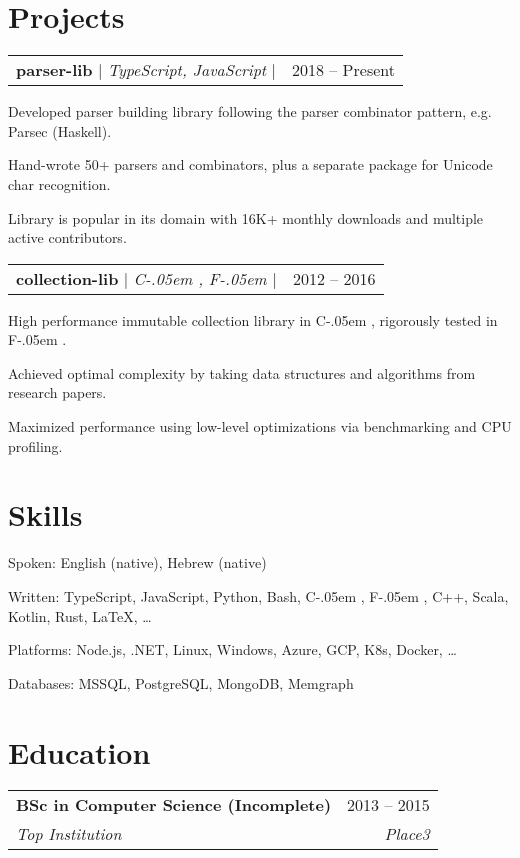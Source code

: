 \documentclass[a4paper,11pt]{article}
\makeatletter
\DeclareRobustCommand*{\https}{\hyper@normalise\https@}
\def\https@#1{\underline{\lowercase{\hyper@linkurl{\Hurl{#1}}{https://#1}}}}
\newcommand{\sharplang}[1]{%
    {\settoheight{\dimen0}{#1}#1\kern-.05em \resizebox{!}{\dimen0}{\raisebox{\depth}{\#}}}%
}
\newcommand{\placeblock}[4]{%
    \vspace{-2pt}\item%
    \begin{tabular*}{0.97\textwidth}[t]{l@{\extracolsep{\fill}}r}%
        \textbf{#1} & #2 \\%
        \textit{\small#3} & \textit{\small #4} \\%
    \end{tabular*}\vspace{-7pt}%
}%
\newenvironment*{project}[2]{%
    \item%
	\begin{tabular*}{0.97\textwidth}{l@{\extracolsep{\fill}}r}%
		\small#1 & #2 \\%
	\end{tabular*}\vspace{-7pt}%
    \begin{itemList}%
    }{%
    \end{itemList}%
}
\newcommand{\mywebsite}{career.gregros.dev}
\newcommand{\parjs}{Parjs}
\newcommand{\imms}{Imms}
\newcommand{\technion}{Technion}
\newcommand{\haifa}{Haifa, Israel}
\renewcommand{\mywebsite}{career.my-site.dev}
\renewcommand{\parjs}{parser-lib}
\renewcommand{\imms}{collection-lib}
\renewcommand{\technion}{Top Institution}
\renewcommand{\haifa}{Place3}
\makeatother
\begin{document}
\section{Projects}
\begin{sectionList}%
    \begin{project}{\textbf{\parjs} $|$ \emph{TypeScript, JavaScript} $|$ \https{\mywebsite/parjs}}{2018 -- Present}
        \item Developed parser building library following the parser combinator pattern, e.g. Parsec (Haskell).
        \item Hand-wrote 50+ parsers and combinators, plus a separate package for Unicode char recognition.
        \item Library is popular in its domain with 16K+ monthly downloads and multiple active contributors.
    \end{project}
    \begin{project}{\textbf{\imms} $|$ \emph{\sharplang{C}, \sharplang{F}} $|$ \https{\mywebsite/imms}}{2012 -- 2016}
        \item High performance immutable collection library in \sharplang{C}, rigorously tested in \sharplang{F}.
        \item Achieved optimal complexity by taking data structures and algorithms from research papers.
        \item Maximized performance using low-level optimizations via benchmarking and CPU profiling.
    \end{project}
\end{sectionList}%

\section{Skills}
\begin{skillList}
    \item[Spoken:] English (native), Hebrew (native)
    \item[Written:] TypeScript, JavaScript, Python, Bash, \sharplang{C}, \sharplang{F}, C++, Scala, Kotlin, Rust, \LaTeX, \dots
    \item[Platforms:] Node.js, .NET, Linux, Windows, Azure, GCP, K8s, Docker, \dots
    \item[Databases:] MSSQL, PostgreSQL, MongoDB, Memgraph
\end{skillList}

\section{Education}
\begin{sectionList}%
    \placeblock{BSc in Computer Science (Incomplete)}{2013 -- 2015}{\technion}{\haifa}
\end{sectionList}

\end{document}

